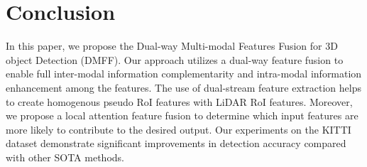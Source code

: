 \begin{sloppypar}
\section{Conclusion}
In this paper, we propose the Dual-way Multi-modal Features Fusion for 3D object Detection (DMFF). Our approach utilizes a dual-way feature fusion to enable full inter-modal information complementarity and intra-modal information enhancement among the features. The use of dual-stream feature extraction helps to create homogenous pseudo RoI features with LiDAR RoI features. Moreover, we propose a local attention feature fusion to determine which input features are more likely to contribute to the desired output. Our experiments on the KITTI dataset demonstrate significant improvements in detection accuracy compared with other SOTA methods.


%
%






\end{sloppypar}
